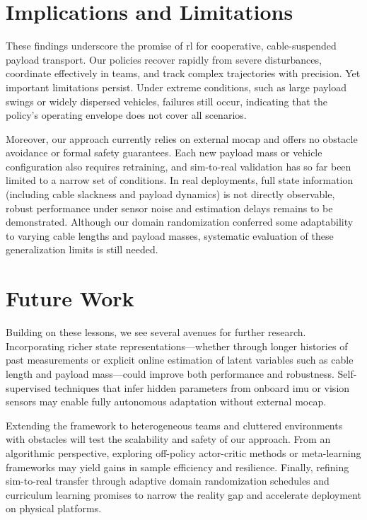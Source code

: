 \section{Implications and Limitations}

These findings underscore the promise of \gls{rl} for cooperative, cable-suspended payload transport.  Our policies recover rapidly from severe disturbances, coordinate effectively in teams, and track complex trajectories with precision.  Yet important limitations persist.  Under extreme conditions, such as large payload swings or widely dispersed vehicles, failures still occur, indicating that the policy's operating envelope does not cover all scenarios.

Moreover, our approach currently relies on external \gls{mocap} and offers no obstacle avoidance or formal safety guarantees.  Each new payload mass or vehicle configuration also requires retraining, and sim-to-real validation has so far been limited to a narrow set of conditions.   In real deployments, full state information (including cable slackness and payload dynamics) is not directly observable, robust performance under sensor noise and estimation delays remains to be demonstrated.  Although our domain randomization conferred some adaptability to varying cable lengths and payload masses, systematic evaluation of these generalization limits is still needed.
\section{Future Work}

Building on these lessons, we see several avenues for further research.  Incorporating richer state representations—whether through longer histories of past measurements or explicit online estimation of latent variables such as cable length and payload mass—could improve both performance and robustness.  Self-supervised techniques that infer hidden parameters from onboard \gls{imu} or vision sensors may enable fully autonomous adaptation without external \gls{mocap}.

Extending the framework to heterogeneous teams and cluttered environments with obstacles will test the scalability and safety of our approach.  From an algorithmic perspective, exploring off-policy actor-critic methods or meta-learning frameworks may yield gains in sample efficiency and resilience.  Finally, refining sim-to-real transfer through adaptive domain randomization schedules and curriculum learning promises to narrow the reality gap and accelerate deployment on physical platforms.


